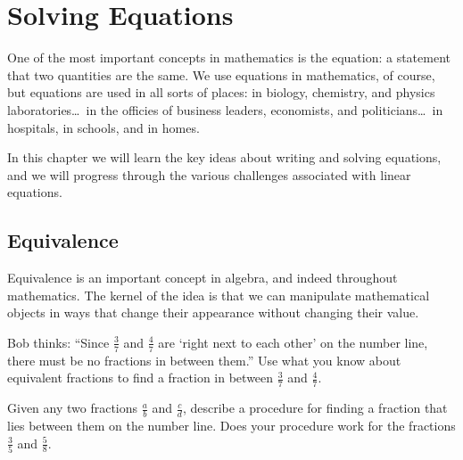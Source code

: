 \chapter{Solving Equations}
\label{ch:equations}


One of the most important concepts in mathematics is the equation: a statement that two quantities are the same. We use equations in mathematics, of course, but equations are used in all sorts of places: in biology, chemistry, and physics laboratories\ldots\ in the officies of business leaders, economists, and politicians\ldots\ in hospitals, in schools, and in homes.

In this chapter we will learn the key ideas about writing and solving equations, and we will progress through the various challenges associated with linear equations.

\section{Equivalence}
\label{sec:equivalence}

Equivalence is an important concept in algebra, and indeed throughout mathematics. The kernel of the idea is that we can manipulate mathematical objects in ways that change their appearance without changing their value.

\begin{boxedexplore}
Bob thinks: ``Since $\frac{3}{7}$ and $\frac{4}{7}$ are `right next to each other' on the number line, there must be no fractions in between them.'' Use what you know about equivalent fractions to find a fraction in between $\frac{3}{7}$ and $\frac{4}{7}$.

Given any two fractions $\frac{a}{b}$ and $\frac{c}{d}$, describe a procedure for finding a fraction that lies between them on the number line. Does your procedure work for the fractions $\frac{3}{5}$ and $\frac{5}{8}$.
\end{boxedexplore} %


